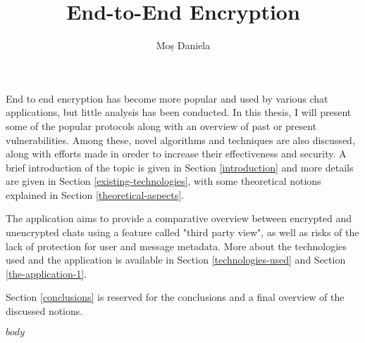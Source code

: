 \documentclass[12pt]{report}
\begin{document}
\title{End-to-End Encryption}
\author{Moș Daniela}			


\maketitle



\cleardoublepage
\abstract

End to end encryption has become more popular and used by various chat applications, but little analysis has been conducted. In this thesis, I will present some of the popular protocols along with an overview of past or present vulnerabilities. Among these, novel algorithms and techniques are also discussed, along with efforts made in oreder to increase their effectiveness and security. A brief introduction of the topic is given in Section \ref{introduction} and more details are given in Section \ref{existing-technologies}, with some theoretical notions explained in Section \ref{theoretical-aspects}. 

The application aims to provide a comparative overview between encrypted and unencrypted chats using a feature called "third party view", as well as risks of the lack of protection for user and message metadata. More about the technologies used and the application is available in Section \ref{technologies-used} and Section \ref{the-application-1}. 

Section \ref{conclusions} is reserved for the conclusions and a final overview of the discussed notions. 

\tableofcontents
\listoffigures

\newpage
{}

$body$
\end{document}
